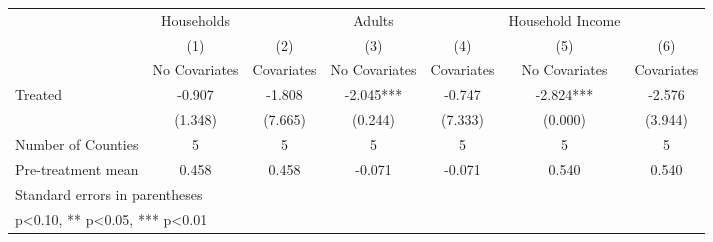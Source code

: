 {
\def\sym#1{\ifmmode^{#1}\else\(^{#1}\)\fi}
\begin{tabular}{l*{6}{c}}
\hline\hline
            &  Households   &               &      Adults   &               &Household Income   &               \\
            &\multicolumn{1}{c}{(1)}&\multicolumn{1}{c}{(2)}&\multicolumn{1}{c}{(3)}&\multicolumn{1}{c}{(4)}&\multicolumn{1}{c}{(5)}&\multicolumn{1}{c}{(6)}\\
            &\multicolumn{1}{c}{No Covariates}&\multicolumn{1}{c}{Covariates}&\multicolumn{1}{c}{No Covariates}&\multicolumn{1}{c}{Covariates}&\multicolumn{1}{c}{No Covariates}&\multicolumn{1}{c}{Covariates}\\
\hline
Treated     &      -0.907   &      -1.808   &      -2.045***&      -0.747   &      -2.824***&      -2.576   \\
            &     (1.348)   &     (7.665)   &     (0.244)   &     (7.333)   &     (0.000)   &     (3.944)   \\
\hline
Number of Counties&           5   &           5   &           5   &           5   &           5   &           5   \\
Pre-treatment mean&       0.458   &       0.458   &      -0.071   &      -0.071   &       0.540   &       0.540   \\
\hline\hline
\multicolumn{7}{l}{\footnotesize Standard errors in parentheses}\\
\multicolumn{7}{l}{\footnotesize * p<0.10, ** p<0.05, *** p<0.01}\\
\end{tabular}
}
